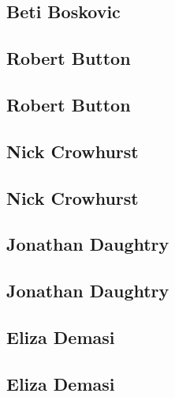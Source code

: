 \documentclass[twoside,14pt,a4paper,notitlepage]{memoir}
\begin{document}
\lipsum[1-2]
\subsection*{Beti Boskovic}
\lipsum[3]



\subsection*{Robert Button}
\label{aut:button}

\lipsum[1-2]
\subsection*{Robert Button}
\lipsum[3]



\subsection*{Nick Crowhurst}
\label{aut:crowhurst}

\lipsum[1-2]
\subsection*{Nick Crowhurst}
\lipsum[3]



\subsection*{Jonathan Daughtry}
\label{aut:daughtry}

\lipsum[1-2]
\subsection*{Jonathan Daughtry}
\lipsum[3]



\subsection*{Eliza Demasi}
\label{aut:demasi}

\lipsum[1-2]
\subsection*{Eliza Demasi}
\lipsum[3]
\end{document}
